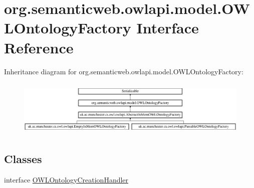 \hypertarget{interfaceorg_1_1semanticweb_1_1owlapi_1_1model_1_1_o_w_l_ontology_factory}{\section{org.\-semanticweb.\-owlapi.\-model.\-O\-W\-L\-Ontology\-Factory Interface Reference}
\label{interfaceorg_1_1semanticweb_1_1owlapi_1_1model_1_1_o_w_l_ontology_factory}
}
Inheritance diagram for org.\-semanticweb.\-owlapi.\-model.\-O\-W\-L\-Ontology\-Factory\-:\begin{figure}[H]
\begin{center}
\leavevmode
\includegraphics[height=2.725061cm]{interfaceorg_1_1semanticweb_1_1owlapi_1_1model_1_1_o_w_l_ontology_factory}
\end{center}
\end{figure}
\subsection*{Classes}
\begin{DoxyCompactItemize}
\item 
interface \hyperlink{interfaceorg_1_1semanticweb_1_1owlapi_1_1model_1_1_o_w_l_ontology_factory_1_1_o_w_l_ontology_creation_handler}{O\-W\-L\-Ontology\-Creation\-Handler}
\end{DoxyCompactItemize}
